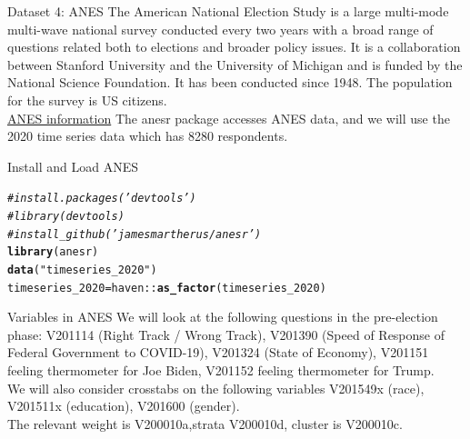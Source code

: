 \documentclass{beamer}\usepackage[]{graphicx}\usepackage[]{color}
\makeatletter
\newcommand{\hlstr}[1]{\textcolor[rgb]{0.192,0.494,0.8}{#1}}%
\newcommand{\hlcom}[1]{\textcolor[rgb]{0.678,0.584,0.686}{\textit{#1}}}%
\newcommand{\hlopt}[1]{\textcolor[rgb]{0,0,0}{#1}}%
\newcommand{\hlstd}[1]{\textcolor[rgb]{0.345,0.345,0.345}{#1}}%
\newcommand{\hlkwb}[1]{\textcolor[rgb]{0.69,0.353,0.396}{#1}}%
\newcommand{\hlkwd}[1]{\textcolor[rgb]{0.737,0.353,0.396}{\textbf{#1}}}%
\newenvironment{kframe}{%
 \def\at@end@of@kframe{}%
 \ifinner\ifhmode%
  \def\at@end@of@kframe{\end{minipage}}%
  \begin{minipage}{\columnwidth}%
 \fi\fi%
 \def\FrameCommand##1{\hskip\@totalleftmargin \hskip-\fboxsep
 \colorbox{shadecolor}{##1}\hskip-\fboxsep
     \hskip-\linewidth \hskip-\@totalleftmargin \hskip\columnwidth}%
 \MakeFramed {\advance\hsize-\width
   \@totalleftmargin\z@ \linewidth\hsize
   \@setminipage}}%
 {\par\unskip\endMakeFramed%
 \at@end@of@kframe}
\newenvironment{knitrout}{}{} %
\makeatother
\begin{document}
\begin{frame}{Dataset 4: ANES}
The American National Election Study is a large multi-mode multi-wave national survey conducted every two years with a broad range of questions related both to elections and broader policy issues. It is a collaboration between Stanford University and the University of Michigan and is funded by the National Science Foundation. It has been conducted since 1948. The population for the survey is US citizens.  \\
\href{https://electionstudies.org/}{ANES information}
The anesr package accesses ANES data, and we will use the 2020 time series data which has 8280 respondents.
\end{frame}

\begin{frame}[fragile]{Install and Load ANES}
\begin{knitrout}
\color{fgcolor}\begin{kframe}
\begin{alltt}
\hlcom{# install.packages('devtools')}
\hlcom{# library(devtools)}
\hlcom{# install_github('jamesmartherus/anesr')}
\hlkwd{library}\hlstd{(anesr)}
\hlkwd{data}\hlstd{(}\hlstr{"timeseries_2020"}\hlstd{)}
\hlstd{timeseries_2020} \hlkwb{=} \hlstd{haven}\hlopt{::}\hlkwd{as_factor}\hlstd{(timeseries_2020)}
\end{alltt}
\end{kframe}
\end{knitrout}
\end{frame}


\begin{frame}{Variables in ANES}
We will look at the following questions in the pre-election phase:  V201114 (Right Track / Wrong Track), V201390  (Speed of Response of Federal Government to COVID-19), V201324 (State of Economy), V201151 feeling thermometer for Joe Biden, V201152 feeling thermometer for Trump. \\
We will also consider crosstabs on the following variables  V201549x (race), V201511x (education), V201600 (gender). \\
The relevant weight is V200010a,strata V200010d, cluster is V200010c.
\end{frame}
\end{document}
